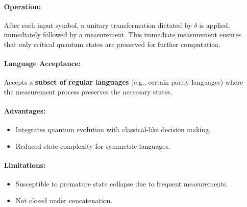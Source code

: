 \paragraph{Operation:}  
After each input symbol, a unitary transformation dictated by \( \delta \) is applied, immediately followed by a measurement. This immediate measurement ensures that only critical quantum states are preserved for further computation.

\paragraph{Language Acceptance:}  
Accepts a \textbf{subset of regular languages} (e.g., certain parity languages) where the measurement process preserves the necessary states.

\paragraph{Advantages:}
\begin{itemize}
    \item Integrates quantum evolution with classical-like decision making.
    \item Reduced state complexity for symmetric languages.
\end{itemize}

\paragraph{Limitations:}
\begin{itemize}
    \item Susceptible to premature state collapse due to frequent measurements.
    \item Not closed under concatenation.
\end{itemize}


